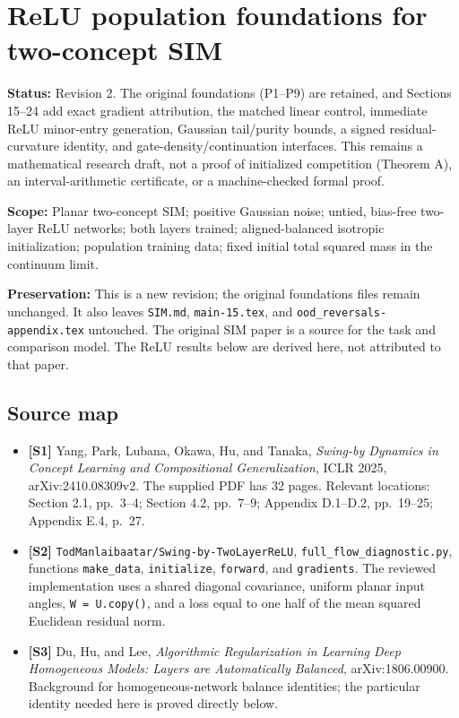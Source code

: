 \documentclass[
  10pt,
]{article}
\author{}
\date{}
\providecommand{\tightlist}{%
  \setlength{\itemsep}{0pt}\setlength{\parskip}{0pt}}
\begin{document}
\section{ReLU population foundations for two-concept
SIM}\label{relu-population-foundations-for-two-concept-sim}

\textbf{Status:} Revision 2. The original foundations (P1--P9) are
retained, and Sections 15--24 add exact gradient attribution, the
matched linear control, immediate ReLU minor-entry generation, Gaussian
tail/purity bounds, a signed residual-curvature identity, and
gate-density/continuation interfaces. This remains a mathematical
research draft, not a proof of initialized competition (Theorem A), an
interval-arithmetic certificate, or a machine-checked formal proof.

\textbf{Scope:} Planar two-concept SIM; positive Gaussian noise; untied,
bias-free two-layer ReLU networks; both layers trained; aligned-balanced
isotropic initialization; population training data; fixed initial total
squared mass in the continuum limit.

\textbf{Preservation:} This is a new revision; the original foundations
files remain unchanged. It also leaves \texttt{SIM.md},
\texttt{main-15.tex}, and \texttt{ood\_reversals-appendix.tex}
untouched. The original SIM paper is a source for the task and
comparison model. The ReLU results below are derived here, not
attributed to that paper.

\subsection{Source map}\label{source-map}

\begin{itemize}
\tightlist
\item
  \textbf{{[}S1{]}} Yang, Park, Lubana, Okawa, Hu, and Tanaka,
  \emph{Swing-by Dynamics in Concept Learning and Compositional
  Generalization}, ICLR 2025, arXiv:2410.08309v2. The supplied PDF has
  32 pages. Relevant locations: Section 2.1, pp.~3--4; Section 4.2,
  pp.~7--9; Appendix D.1--D.2, pp.~19--25; Appendix E.4, p.~27.
\item
  \textbf{{[}S2{]}} \texttt{TodManlaibaatar/Swing-by-TwoLayerReLU},
  \texttt{full\_flow\_diagnostic.py}, functions \texttt{make\_data},
  \texttt{initialize}, \texttt{forward}, and \texttt{gradients}. The
  reviewed implementation uses a shared diagonal covariance, uniform
  planar input angles, \texttt{W\ =\ U.copy()}, and a loss equal to one
  half of the mean squared Euclidean residual norm.
\item
  \textbf{{[}S3{]}} Du, Hu, and Lee, \emph{Algorithmic Regularization in
  Learning Deep Homogeneous Models: Layers are Automatically Balanced},
  arXiv:1806.00900. Background for homogeneous-network balance
  identities; the particular identity needed here is proved directly
  below.
\end{itemize}
\end{document}
